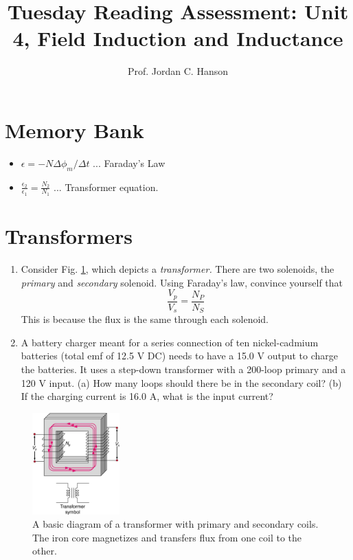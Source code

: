 \documentclass{article}
\begin{document}
\title{Tuesday Reading Assessment: Unit 4, Field Induction and Inductance}
\author{Prof. Jordan C. Hanson}

\maketitle

\section{Memory Bank}

\begin{itemize}
\item $\epsilon = -N \Delta \phi_m /\Delta t$ ... Faraday's Law
\item $\frac{\epsilon_2}{\epsilon_1} = \frac{N_2}{N_1}$ ... Transformer equation.
\end{itemize}

\section{Transformers}

\begin{enumerate}
\item Consider Fig. \ref{fig:trans}, which depicts a \textit{transformer.}  There are two solenoids, the \textit{primary} and \textit{secondary} solenoid.  Using Faraday's law, convince yourself that
\begin{equation}
\frac{V_p}{V_s} = \frac{N_P}{N_S}
\end{equation}
This is because the flux is the same through each solenoid. \\ \vspace{1cm}
\item A battery charger meant for a series connection of ten nickel-cadmium batteries (total emf of 12.5 V DC) needs to have a 15.0 V output to charge the batteries. It uses a step-down transformer with a 200-loop primary and a 120 V input. (a) How many loops should there be in the secondary coil? (b) If the charging current is 16.0 A, what is the input current? \\ \vspace{1cm}
\end{enumerate}

\begin{figure}[hb]
\centering
\includegraphics[width=0.3\textwidth]{transformer.jpeg}
\caption{\label{fig:trans} A basic diagram of a transformer with primary and secondary coils.  The iron core magnetizes and transfers flux from one coil to the other.}
\end{figure}
\end{document}
